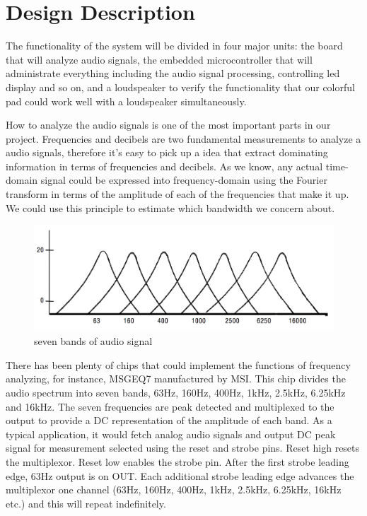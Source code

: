 \documentclass[12pt,a4paper,journal]{IEEEtran}
\begin{document}
\section{Design Description}

The functionality of the system will be divided in four major units: the board that will analyze audio signals, the embedded microcontroller that will administrate everything including the audio signal processing, controlling led display and so on, and a loudspeaker to verify the functionality that our colorful pad could work well with a loudspeaker simultaneously.

How to analyze the audio signals is one of the most important parts in our project. Frequencies and decibels are two fundamental measurements to analyze a audio signals, therefore it's easy to pick up a idea that extract dominating information in terms of frequencies and decibels. As we know, any actual time-domain signal could be expressed into frequency-domain using the Fourier transform in terms of the amplitude of each of the frequencies that make it up. We could use this principle to estimate which bandwidth we concern about.
\begin{figure}[ht]
  \centering
  \includegraphics[width=0.9\linewidth]{frequencyaudio.png}
  \caption{seven bands of audio signal}
  \label{fig:fras}
\end{figure}
There has been plenty of chips that could implement the functions of frequency analyzing, for instance, MSGEQ7 manufactured by MSI. This chip divides the audio spectrum into seven bands, 63Hz, 160Hz, 400Hz, 1kHz, 2.5kHz, 6.25kHz and 16kHz. The seven frequencies are peak detected and multiplexed to the output to provide a DC representation of the amplitude of each band. As a typical application, it would fetch analog audio signals and output DC peak signal for measurement selected using the reset and strobe pins. Reset high resets the multiplexor. Reset low enables the strobe pin. After the first strobe leading edge, 63Hz output is on OUT. Each additional strobe leading edge advances the multiplexor one channel (63Hz, 160Hz, 400Hz, 1kHz, 2.5kHz, 6.25kHz, 16kHz etc.) and this will repeat indefinitely.
\end{document}
